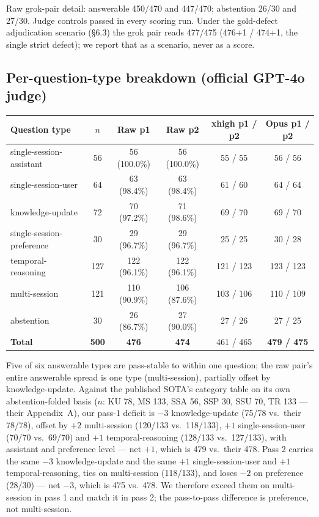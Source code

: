 \documentclass[11pt]{article}
\begin{document}
Raw grok-pair detail: answerable 450/470 and 447/470; abstention 26/30
and 27/30. Judge controls passed in every scoring run. Under the gold-defect
adjudication scenario (\S6.3) the grok pair reads 477/475 (476+1 / 474+1, the
single strict defect); we report that as a scenario, never as a score.

\subsection{Per-question-type breakdown (official GPT-4o judge)}
\begin{center}
\small
\begin{tabular}{lccccc}
\toprule
Question type & $n$ & Raw p1 & Raw p2 & xhigh p1 / p2 & Opus p1 / p2\\
\midrule
single-session-assistant & 56 & 56 (100.0\%) & 56 (100.0\%) & 55 / 55 & 56 / 56\\
single-session-user & 64 & 63 (98.4\%) & 63 (98.4\%) & 61 / 60 & 64 / 64\\
knowledge-update & 72 & 70 (97.2\%) & 71 (98.6\%) & 69 / 70 & 69 / 70\\
single-session-preference & 30 & 29 (96.7\%) & 29 (96.7\%) & 25 / 25 & 30 / 28\\
temporal-reasoning & 127 & 122 (96.1\%) & 122 (96.1\%) & 121 / 123 & 123 / 123\\
multi-session & 121 & 110 (90.9\%) & 106 (87.6\%) & 103 / 106 & 110 / 109\\
abstention & 30 & 26 (86.7\%) & 27 (90.0\%) & 27 / 26 & 27 / 25\\
\midrule
\textbf{Total} & \textbf{500} & \textbf{476} & \textbf{474} & 461 / 465 & \textbf{479 / 475}\\
\bottomrule
\end{tabular}
\end{center}

Five of six answerable types are pass-stable to within one question; the raw
pair's entire answerable spread is one type (multi-session), partially offset
by knowledge-update. Against the published SOTA's category table on its own abstention-folded
basis ($n$: KU 78, MS 133, SSA 56, SSP 30, SSU 70, TR 133 --- their
Appendix~A), our pass-1 deficit is $-3$ knowledge-update (75/78 vs.\ their
78/78), offset by $+2$ multi-session (120/133 vs.\ 118/133), $+1$
single-session-user (70/70 vs.\ 69/70) and $+1$ temporal-reasoning (128/133
vs.\ 127/133), with assistant and preference level --- net $+1$, which is 479
vs.\ their 478. Pass 2 carries the same $-3$ knowledge-update and the same
$+1$ single-session-user and $+1$ temporal-reasoning, ties on multi-session
(118/133), and loses $-2$ on preference (28/30) --- net $-3$,
which is 475 vs.\ 478. We therefore exceed them on multi-session in pass 1 and
match it in pass 2; the pass-to-pass difference is preference, not
multi-session.
\end{document}
